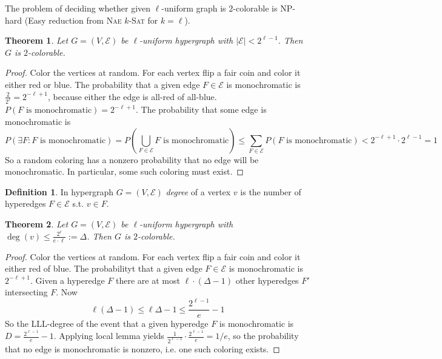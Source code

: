 \documentclass{article}
\theoremstyle{plain}
\newtheorem{thm}{Theorem}
\theoremstyle{definition}
\newtheorem{defn}{Definition}
\newcommand{\naekSAT}{\textsc{Nae $k$-Sat}\xspace}
\newcommand{\NP}{\textsf{NP}\xspace}
\begin{document}
The problem of deciding whether given $\ell$-uniform graph is $2$-colorable is \NP-hard (Easy reduction from \naekSAT for $k=\ell$).

\begin{thm}
	Let $G=(V,\mathcal{E})$ be $\ell$-uniform hypergraph with $|\mathcal{E}|<2^{\ell - 1}$. Then $G$ is $2$-colorable.
\end{thm}
\begin{proof}
	Color the vertices at random. For each vertex flip a fair coin and color it either red or blue. The probability that a given edge $F\in \mathcal{E}$ is monochromatic is $\frac{2}{2^{\ell}}=2^{-\ell+1}$, because either the edge is all-red of all-blue. $P(F \text{ is monochromatic})=2^{-\ell +1}$. The probability that some edge is monochromatic is
	$$
	P(\exists F: F\text{ is monochromatic})=P(\bigcup_{F\in \mathcal{E}}{F \text{ is monochromatic}})\leq \sum_{F\in\mathcal{E}}P(F \text{ is monochromatic})<2^{-\ell + 1}\cdot 2^{\ell - 1} = 1 
	$$
	So a random coloring has a nonzero probability that no edge will be monochromatic. In particular, some such coloring must exist.
\end{proof}
\begin{defn}
	In hypergraph $G=(V,\mathcal{E})$ \textit{degree} of a vertex $v$ is the number of hyperedges $F\in\mathcal{E}$ s.t. $v\in F$.
\end{defn}
\begin{thm}
	Let $G=(V,\mathcal{E})$ be $\ell$-uniform hypergraph with $\deg(v)\leq \frac{2^{\ell}}{e\cdot \ell}:=\Delta$. Then $G$ is $2$-colorable.
\end{thm}
\begin{proof}
	Color the vertices  at random. For each vertex flip a fair coin and color it either red of blue. The probabilityt that a given edge $F\in\mathcal{E}$ is monochromatic is $2^{-\ell + 1}$. Given a hyperedge $F$ there are at most $\ell \cdot (\Delta-1)$ other hyperedges $F'$ intersecting $F$. Now
	$$
	\ell (\Delta - 1) \leq \ell \Delta - 1 \leq \frac{2^{\ell - 1}}{e}-1
	$$
	So the LLL-degree of the event that a given hyperedge $F$ is monochromatic is $D= \frac{2^{\ell - 1}}{e}-1$. Applying local lemma yields $\frac{1}{2^{\ell - 1}}\cdot\frac{2^{\ell - 1}}{e}=1/e$, so the probability that no edge is monochromatic is nonzero, i.e. one such coloring exists.
\end{proof}
\end{document}
